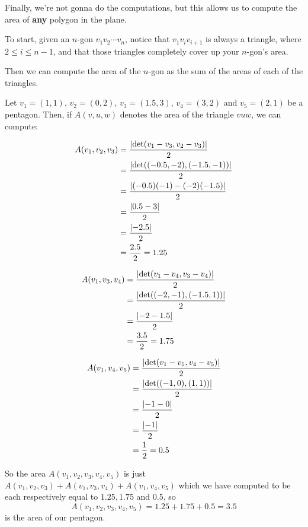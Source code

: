 Finally, we're not gonna do the computations, but this allows us to compute the area of \textbf{any} polygon in the plane.

To start, given an $n$-gon $v_1v_2\cdots v_n$, notice that $v_1v_iv_{i+1}$ is always a triangle, where $2\leq i\leq n-1$, and that those triangles completely cover up your $n$-gon's area.

Then we can compute the area of the $n$-gon as the sum of the areas of each of the triangles.

\begin{ex}
	Let $v_1=(1,1)$, $v_2=(0,2)$, $v_3=(1.5,3)$, $v_4=(3,2)$ and $v_5=(2,1)$ be a pentagon. Then, if $A(v,u,w)$ denotes the area of the triangle $vuw$, we can compute:
	
	\begin{align*}
			A(v_1,v_2,v_3)&=\frac{\left\vert\det(v_1-v_3,v_2-v_3)\right\vert}{2}\\
			&=\frac{\left\vert\det((-0.5,-2),(-1.5,-1))\right\vert}{2}\\
			&=\frac{\left\vert(-0.5)(-1)-(-2)(-1.5)\right\vert}{2}\\
			&=\frac{\left\vert0.5-3\right\vert}{2}\\
			&=\frac{\left\vert-2.5\right\vert}{2}\\
			&=\frac{2.5}{2}=1.25
	\end{align*}
	
	\begin{align*}
		A(v_1,v_3,v_4)&=\frac{\left\vert\det(v_1-v_4,v_3-v_4)\right\vert}{2}\\
		&=\frac{\left\vert\det((-2,-1),(-1.5,1))\right\vert}{2}\\
		&=\frac{\left\vert-2-1.5\right\vert}{2}\\
		&=\frac{3.5}{2}=1.75
	\end{align*}
	
	\begin{align*}
		A(v_1,v_4,v_5)&=\frac{\left\vert\det(v_1-v_5,v_4-v_5)\right\vert}{2}\\
		&=\frac{\left\vert\det((-1,0),(1,1))\right\vert}{2}\\
		&=\frac{\left\vert-1-0\right\vert}{2}\\
		&=\frac{\left\vert-1\right\vert}{2}\\
		&=\frac{1}{2}=0.5
	\end{align*}

So the area $A(v_1,v_2,v_3,v_4,v_5)$ is just $A(v_1,v_2,v_3)+A(v_1,v_3,v_4)+A(v_1,v_4,v_5)$ which we have computed to be each respectively equal to $1.25,1.75$ and $0.5$, so
\[A(v_1,v_2,v_3,v_4,v_5)=1.25+1.75+0.5=3.5\]is the area of our pentagon.


\end{ex}
